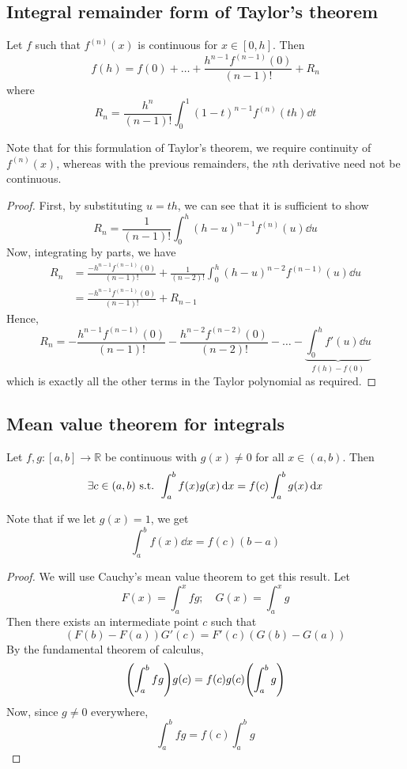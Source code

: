 \subsection{Integral remainder form of Taylor's theorem}
\begin{theorem}
	Let \(f\) such that \(f^{(n)}(x)\) is continuous for \(x \in [0, h]\).
	Then
	\[
		f(h) = f(0) + \dots + \frac{h^{n-1}f^{(n-1)}(0)}{(n-1)!} + R_n
	\]
	where
	\[
		R_n = \frac{h^n}{(n-1)!} \int_0^1 (1-t)^{n-1}f^{(n)}(th) \dd{t}
	\]
\end{theorem}
\noindent Note that for this formulation of Taylor's theorem, we require continuity of \(f^{(n)}(x)\), whereas with the previous remainders, the \(n\)th derivative need not be continuous.
\begin{proof}
	First, by substituting \(u = th\), we can see that it is sufficient to show
	\[
		R_n = \frac{1}{(n-1)!} \int_0^h (h - u)^{n-1}f^{(n)}(u) \dd{u}
	\]
	Now, integrating by parts, we have
	\begin{align*}
		R_n & = \frac{-h^{n-1}f^{(n-1)}(0)}{(n-1)!} + \frac{1}{(n-2)!}\int_0^h (h - u)^{n-2}f^{(n-1)}(u) \dd{u} \\
		    & = \frac{-h^{n-1}f^{(n-1)}(0)}{(n-1)!} + R_{n-1}
	\end{align*}
	Hence,
	\[
		R_n = -\frac{h^{n-1}f^{(n-1)}(0)}{(n-1)!} - \frac{h^{n-2}f^{(n-2)}(0)}{(n-2)!} - \dots - \underbrace{\int_0^h f'(u) \dd{u}}_{f(h) - f(0)}
	\]
	which is exactly all the other terms in the Taylor polynomial as required.
\end{proof}

\subsection{Mean value theorem for integrals}
\begin{theorem}
	Let \(f, g \colon [a, b] \to \mathbb R\) be continuous with \(g(x) \neq 0\) for all \(x \in (a, b)\).
	Then
	\[
		\exists c \in (a, b) \text{ s.t. } \int_a^b f(x) g(x) \dd{x} = f(c)\int_a^b g(x)\dd{x}
	\]
\end{theorem}
\noindent Note that if we let \(g(x) = 1\), we get
\[
	\int_a^b f(x) \dd{x} = f(c)(b-a)
\]
\begin{proof}
	We will use Cauchy's mean value theorem to get this result.
	Let
	\[
		F(x) = \int_a^x fg;\quad G(x) = \int_a^x g
	\]
	Then there exists an intermediate point \(c\) such that
	\[
		(F(b) - F(a))G'(c) = F'(c)(G(b) - G(a))
	\]
	By the fundamental theorem of calculus,
	\[
		\qty(\int_a^b fg)g(c) = f(c)g(c)\qty(\int_a^b g)
	\]
	Now, since \(g \neq 0\) everywhere,
	\[
		\int_a^b fg = f(c)\int_a^b g
	\]
\end{proof}

